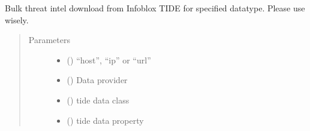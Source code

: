 \documentclass[letterpaper,10pt,english]{sphinxmanual}
\begin{document}
\begin{fulllineitems}
\begin{fulllineitems}
\begin{quote}
\begin{description}
\end{description}\end{quote}

\end{fulllineitems}


\begin{fulllineitems}
\label{\detokenize{b1td-class:bloxone.b1td.tidedatafeed}}
\sphinxAtStartPar
Bulk threat intel download from Infoblox TIDE
for specified datatype. Please use wisely.
\begin{quote}\begin{description}
\item[{Parameters}] \leavevmode\begin{itemize}
\item {} 
\sphinxAtStartPar
{} () \textendash{} “host”, “ip” or “url”

\item {} 
\sphinxAtStartPar
{} (\sphinxstyleliteralemphasis{\sphinxupquote{, }}) \textendash{} Data provider

\item {} 
\sphinxAtStartPar
{} (\sphinxstyleliteralemphasis{\sphinxupquote{, }}) \textendash{} tide data class

\item {} 
\sphinxAtStartPar
{} (\sphinxstyleliteralemphasis{\sphinxupquote{, }}) \textendash{} tide data property


\end{itemize}
\end{description}
\end{quote}
\end{fulllineitems}
\end{fulllineitems}
\end{document}

